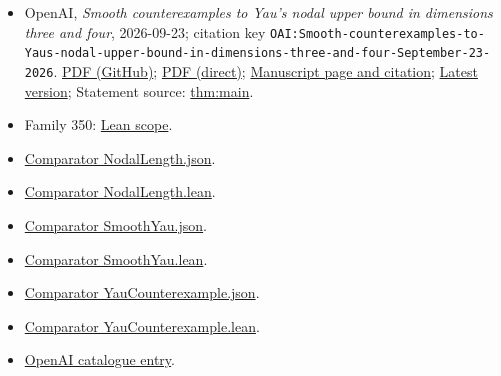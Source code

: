 \documentclass[11pt]{article}
\begin{document}
\begin{itemize}
\item OpenAI, \emph{Smooth counterexamples to Yau's nodal upper bound in dimensions three and four}, 2026-09-23; citation key \texttt{OAI:Smooth-counterexamples-to-Yaus-nodal-upper-bound-in-dimensions-three-and-four-September-23-2026}. \href{https://github.com/openai/math/blob/adc7f1241b42e322a6451854ab7e4b4c146bf78a/preprints/Smooth-counterexamples-to-Yaus-nodal-upper-bound-in-dimensions-three-and-four-September-23-2026/paper.pdf}{PDF (GitHub)}; \href{https://github.com/openai/math/raw/adc7f1241b42e322a6451854ab7e4b4c146bf78a/preprints/Smooth-counterexamples-to-Yaus-nodal-upper-bound-in-dimensions-three-and-four-September-23-2026/paper.pdf}{PDF (direct)}; \href{https://github.com/openai/math/blob/adc7f1241b42e322a6451854ab7e4b4c146bf78a/preprints/Smooth-counterexamples-to-Yaus-nodal-upper-bound-in-dimensions-three-and-four-September-23-2026/README.md}{Manuscript page and citation}; \href{https://github.com/openai/math/blob/main/preprints/Smooth-counterexamples-to-Yaus-nodal-upper-bound-in-dimensions-three-and-four-September-23-2026/paper.pdf}{Latest version}; Statement source: \href{https://github.com/openai/math/blob/adc7f1241b42e322a6451854ab7e4b4c146bf78a/preprints/Smooth-counterexamples-to-Yaus-nodal-upper-bound-in-dimensions-three-and-four-September-23-2026/build/sections/introduction.tex\#L18}{thm:main}.
\item Family 350: \href{https://github.com/openai/math/blob/adc7f1241b42e322a6451854ab7e4b4c146bf78a/lean/docs/350.md}{Lean scope}.
\item \href{https://github.com/openai/math/blob/adc7f1241b42e322a6451854ab7e4b4c146bf78a/lean/ComparatorChallenges/NodalLength.json}{Comparator NodalLength.json}.
\item \href{https://github.com/openai/math/blob/adc7f1241b42e322a6451854ab7e4b4c146bf78a/lean/ComparatorChallenges/NodalLength.lean}{Comparator NodalLength.lean}.
\item \href{https://github.com/openai/math/blob/adc7f1241b42e322a6451854ab7e4b4c146bf78a/lean/ComparatorChallenges/SmoothYau.json}{Comparator SmoothYau.json}.
\item \href{https://github.com/openai/math/blob/adc7f1241b42e322a6451854ab7e4b4c146bf78a/lean/ComparatorChallenges/SmoothYau.lean}{Comparator SmoothYau.lean}.
\item \href{https://github.com/openai/math/blob/adc7f1241b42e322a6451854ab7e4b4c146bf78a/lean/ComparatorChallenges/YauCounterexample.json}{Comparator YauCounterexample.json}.
\item \href{https://github.com/openai/math/blob/adc7f1241b42e322a6451854ab7e4b4c146bf78a/lean/ComparatorChallenges/YauCounterexample.lean}{Comparator YauCounterexample.lean}.
\item \href{https://github.com/openai/math/blob/adc7f1241b42e322a6451854ab7e4b4c146bf78a/CONTENTS.md}{OpenAI catalogue entry}.
\end{itemize}
\end{document}
